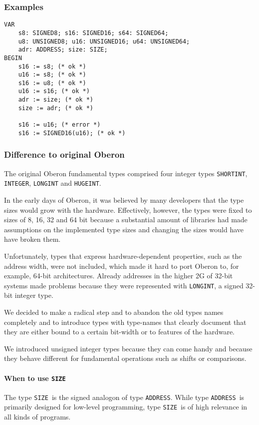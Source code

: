 \documentclass[a4wide,11pt]{article}
\newcommand{\ADDRESS}{\lstinline"ADDRESS"}
\newcommand{\SIZE}{\lstinline"SIZE"}
\begin{document}
\begin{annotation}
\subsubsection{Examples}
\begin{lstlisting}[style=example]
VAR
	s8: SIGNED8; s16: SIGNED16; s64: SIGNED64;
	u8: UNSIGNED8; u16: UNSIGNED16; u64: UNSIGNED64;
	adr: ADDRESS; size: SIZE;
BEGIN
	s16 := s8; (* ok *)
	u16 := s8; (* ok *)
	s16 := u8; (* ok *)
	u16 := s16; (* ok *)
	adr := size; (* ok *)
	size := adr; (* ok *)

	s16 := u16; (* error *)
	s16 := SIGNED16(u16); (* ok *)
\end{lstlisting}

\subsubsection{Difference to original Oberon}
The original Oberon fundamental types comprised four integer types \lstinline"SHORTINT", \lstinline"INTEGER", \lstinline"LONGINT" and \lstinline"HUGEINT".

In the early days of Oberon, it was believed by many developers that the type sizes would grow with the hardware.
Effectively, however, the types were fixed to sizes of 8, 16, 32 and 64 bit because a substantial amount of libraries had made assumptions on the implemented type sizes and changing the sizes would have have broken them.

Unfortunately, types that express hardware-dependent properties, such as the address width, were not included, which made it hard to port Oberon to, for example, 64-bit architectures.
Already addresses in the higher 2G of 32-bit systems made problems because they were represented with \lstinline"LONGINT", a signed 32-bit integer type.

We decided to make a radical step and to abandon the old types names completely and to introduce types with type-names that clearly document that they are either bound to a certain bit-width or to features of the hardware.

We introduced unsigned integer types because they can come handy and because they behave different for fundamental operations such as shifts or comparisons.

\paragraph{When to use \SIZE} The type \SIZE\ is the signed analogon of type \ADDRESS.
While type \ADDRESS\ is primarily designed for low-level programming, type \SIZE\ is of high relevance in all kinds of programs.


\end{annotation}
\end{document}
